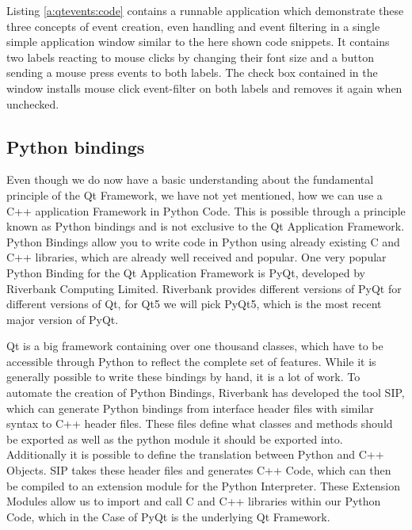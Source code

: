 

Listing \ref{a:qtevents:code} contains a runnable application which demonstrate
these three concepts of event creation, even handling and event filtering in a
single simple application window similar to the here shown code snippets. It
contains two labels reacting to mouse clicks by changing their font size and a
button sending a mouse press events to both labels. The check box contained in
the window installs mouse click event-filter on both labels and removes it
again when unchecked.
\cite{EventSystem,AnotherLookAtEvents,EventFilters}



\subsection{Python bindings}
\label{sec:fundamentals:qt:pyqt}

Even though we do now have a basic understanding about the fundamental principle
of the Qt Framework, we have not yet mentioned, how we can use a C++ application
Framework in Python Code. This is possible through a principle known as Python
bindings and is not exclusive to the Qt Application Framework. Python Bindings
allow you to write code in Python using already existing C and C++ libraries,
which are already well received and popular. One very popular Python Binding for
the Qt Application Framework is PyQt, developed by Riverbank Computing Limited.
Riverbank provides different versions of PyQt for different versions of Qt, for
Qt5 we will pick PyQt5, which is the most recent major version of PyQt.
\cite{PyQtIntro}

Qt is a big framework containing over one thousand classes, which have to be
accessible through Python to reflect the complete set of features. While it is
generally possible to write these bindings by hand, it is a lot of work. To
automate the creation of Python Bindings, Riverbank has developed the tool SIP,
which can generate Python bindings from interface header files with similar
syntax to C++ header files. These files define what classes and methods should
be exported as well as the python module it should be exported into. Additionally
it is possible to define the translation between Python and C++ Objects.  SIP
takes these header files and generates C++ Code, which can then be compiled
to an extension module for the Python Interpreter. These Extension Modules allow
us to import and call C and C++ libraries within our Python Code, which in the
Case of PyQt is the underlying Qt Framework.
\cite{SipIntro, SipTut, ExtendingPython}

